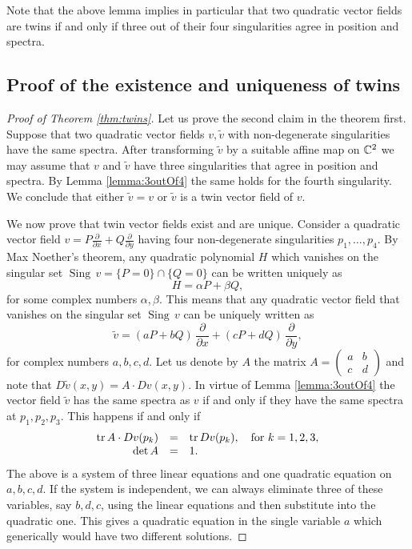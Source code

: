 \documentclass[phd,tocprelim]{cornell}
\begin{document}
Note that the above lemma implies in particular that two quadratic vector fields are twins if and only if three out of their four singularities agree in position and spectra.


\subsection{Proof of the existence and uniqueness of twins}

\begin{proof}[Proof of Theorem \ref*{thm:twins}]
Let us prove the second claim in the theorem first. Suppose that two quadratic vector fields $v,\tilde{v}$ with non-degenerate singularities have the same spectra. After transforming $\tilde{v}$ by a suitable affine map on $\mathbb{C}^2$ we may assume that $v$ and $\tilde{v}$ have three singularities that agree in position and spectra. By Lemma \ref{lemma:3outOf4} the same holds for the fourth singularity. We conclude that either $\tilde{v}=v$ or $\tilde{v}$ is a twin vector field of $v$.

We now prove that twin vector fields exist and are unique. Consider a quadratic vector field $v=P\frac{\partial}{\partial x}+Q\frac{\partial}{\partial y}$ having four non-degenerate singularities $p_1,\ldots,p_4$. By Max Noether's theorem, any quadratic polynomial $H$ which vanishes on the singular set $\operatorname{Sing}\,v=\{P=0\}\cap\{Q=0\}$ can be written uniquely as
\[ H=\alpha P+\beta Q, \]
for some complex numbers $\alpha,\beta$. This means that any quadratic vector field that vanishes on the singular set $\operatorname{Sing}\,v$ can be uniquely written as
\[ \tilde{v}=(aP+bQ)\,\frac{\partial}{\partial x}+(cP+dQ)\,\frac{\partial}{\partial y}, \]
for complex numbers $a,b,c,d$. Let us denote by $A$ the matrix $A=\left(\begin{smallmatrix}a&b\\c&d\end{smallmatrix}\right)$ and note that $D\tilde{v}(x,y)=A\cdot Dv(x,y)$. In virtue of Lemma \ref{lemma:3outOf4} the vector field $\tilde{v}$ has the same spectra as $v$ if and only if they have the same spectra at $p_1,p_2,p_3$. This happens if and only if
\begin{equation}\label{eq:system} \begin{array}{rcl}
\operatorname{tr}{A\cdot Dv(p_k)}&=&\operatorname{tr}{Dv(p_k)},\quad \mbox{for } k=1,2,3, \\
\det{A} &=& 1. \\
\end{array} \end{equation}
The above is a system of three linear equations and one quadratic equation on $a,b,c,d$. If the system is independent, we can always eliminate three of these variables, say $b,d,c$, using the linear equations and then substitute into the quadratic one. This gives a quadratic equation in the single variable $a$ which generically would have two different solutions. 


\end{proof}
\end{document}
